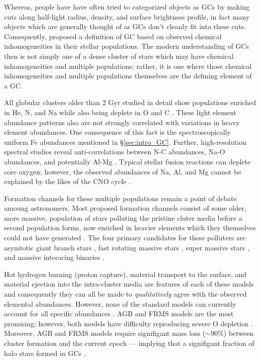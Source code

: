 Whereas, people have have often tried to categorized objects as GCs by making
cuts along half-light radius, density, and surface brightness profile, in fact
many objects which are generally thought of as GCs don't cleanly fit into these
cuts. Consequently, \citet{Carretta2010} proposed a definition of GC based on
observed chemical inhomogeneities in their stellar populations. The modern
understanding of GCs then is not simply one of a dense cluster of stars which
may have chemical inhomogeneities and multiple populations; rather, it is one
where those chemical inhomogeneities and multiple populations themselves are
the defining element of a GC.

All globular clusters older than 2 Gyr studied in detail show populations
enriched in He, N, and Na while also being deplete in O and C
\citep{Piotto2015,Bastian2018}. These light element abundance patterns also are
not strongly correlated with variations in heavy element abundances. One
consequence of this fact is the spectroscopically uniform Fe abundances
mentioned in \S\ref{sec:intro_GC}. Further, high-resolution spectral studies
reveal anti-correlations between N-C abundances, Na-O abundances, and
potentially Al-Mg \citep{Sneden1992, Gratton2012}. Typical stellar fusion
reactions can deplete core oxygen; however, the observed abundances of Na, Al,
and Mg cannot be explained by the likes of the CNO cycle \citep{Prantzos2007}.

Formation channels for these multiple populations remain a point of debate
amoung astronomers. Most proposed formation channels consist of some older,
more massive, population of stars polluting the pristine cluter media before a
second population forms, now enriched in heavier elements which they themselves could
not have generated \citep[for a detailed review see ][]{Gratton2012}. The four
primary candidates for these polluters are asymtotic giant branch stars
\citep[AGBs,][]{Ventura2001,DErcole2010}, fast rotating massive stars
\citep[FRMSs,][]{Decressin2007}, super massive stars
\citep[SMSs,][]{Denissenkov2014}, and massive interacing binaries
\citep[MIBs,][]{deMink2009, Bastian2018}. 

Hot hydrogen burning (proton capture), material transport to the surface, and
material ejection into the intra-cluster media are features of each of these
models and consequently they can all be made to {\it qualitatively} agree with
the observed elemental abundances. However, none of the standard models can
currently account for all specific abundances \citep{Gratton2012}. AGB and FRMS
models are the most promising; however, both models have difficulty reproducing
severe O depletion \citep{Ventura2009,Decressin2007}. Moreover, AGB and FRMS
models require signifigant mass loss ($\sim 90\%$) between cluster formation
and the current epoch --- implying that a signifigant fraction of halo stars
formed in GCs \citep{Renzini2008,DErcole2008,Bastian2015}.

